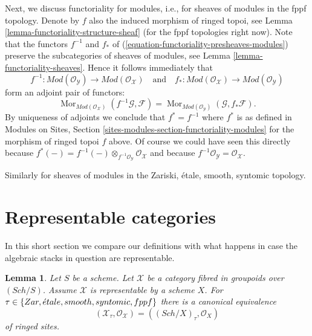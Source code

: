 \documentclass{stacks-project}
\theoremstyle{plain}
\newtheorem{lemma}[subsection]{Lemma}
\theoremstyle{definition}
\theoremstyle{remark}
\numberwithin{equation}{subsection}
\def\Sch{\mathit{Sch}}
\def\Mor{\mathop{\mathrm{Mor}}\nolimits}
\def\etale{{\acute{e}tale}}
\begin{document}
\medskip\noindent
Next, we discuss functoriality for modules, i.e., for sheaves of modules
in the fppf topology. Denote by $f$ also the induced morphism of ringed
topoi, see
Lemma \ref{lemma-functoriality-structure-sheaf}
(for the fppf topologies right now). Note that the functors
$f^{-1}$ and $f_*$ of (\ref{equation-functoriality-presheaves-modules})
preserve the subcategories of sheaves of modules, see
Lemma \ref{lemma-functoriality-sheaves}.
Hence it follows immediately that
\begin{equation}
\label{equation-functoriality-sheaves-modules}
f^{-1} :
\textit{Mod}(\mathcal{O}_\mathcal{Y})
\longrightarrow
\textit{Mod}(\mathcal{O}_\mathcal{X})
\quad\text{and}\quad
f_* :
\textit{Mod}(\mathcal{O}_\mathcal{X})
\longrightarrow
\textit{Mod}(\mathcal{O}_\mathcal{Y})
\end{equation}
form an adjoint pair of functors:
$$
\Mor_{\textit{Mod}(\mathcal{O}_\mathcal{X})}(
f^{-1}\mathcal{G}, \mathcal{F})
=
\Mor_{\textit{Mod}(\mathcal{O}_\mathcal{Y})}(
\mathcal{G}, f_*\mathcal{F}).
$$
By uniqueness of adjoints we conclude that
$f^* = f^{-1}$ where $f^*$ is as defined in
Modules on Sites, Section \ref{sites-modules-section-functoriality-modules}
for the morphism of ringed topoi $f$ above. Of course we could have
seen this directly because
$f^*(-) = f^{-1}(-) \otimes_{f^{-1}\mathcal{O}_\mathcal{Y}}
\mathcal{O}_\mathcal{X}$ and because
$f^{-1}\mathcal{O}_\mathcal{Y} = \mathcal{O}_\mathcal{X}$.

\medskip\noindent
Similarly for sheaves of modules in the Zariski, \'etale, smooth, syntomic
topology.



\section{Representable categories}
\label{section-representable}

\noindent
In this short section we compare our definitions with what happens
in case the algebraic stacks in question are representable.

\begin{lemma}
\label{lemma-compare-with-scheme}
Let $S$ be a scheme. Let $\mathcal{X}$ be a category fibred
in groupoids over $(\Sch/S)$. Assume $\mathcal{X}$ is representable
by a scheme $X$. For $\tau \in \{Zar,\linebreak[0] \etale,\linebreak[0]
smooth,\linebreak[0] syntomic,\linebreak[0] fppf\}$
there is a canonical equivalence
$$
(\mathcal{X}_\tau, \mathcal{O}_\mathcal{X}) =
((\Sch/X)_\tau, \mathcal{O}_X)
$$
of ringed sites.
\end{lemma}
\end{document}
